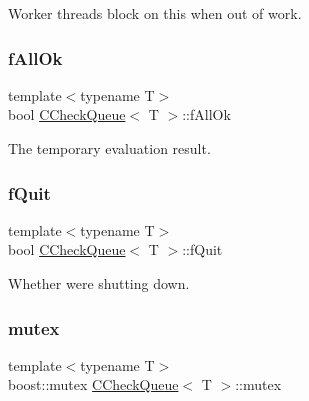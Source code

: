 Worker threads block on this when out of work. 

\mbox{\label{class_c_check_queue_a0f8ef0bce2f6c6ee71c85215a90ed41e}} 
\subsubsection{\texorpdfstring{f\+All\+Ok}{fAllOk}}
{\footnotesize\ttfamily template$<$typename T$>$ \\
bool \mbox{\hyperlink{class_c_check_queue}{C\+Check\+Queue}}$<$ T $>$\+::f\+All\+Ok\hspace{0.3cm}{\ttfamily [private]}}



The temporary evaluation result. 

\mbox{\label{class_c_check_queue_a46ea155382762d0f556cdfa3433f04c6}} 
\subsubsection{\texorpdfstring{f\+Quit}{fQuit}}
{\footnotesize\ttfamily template$<$typename T$>$ \\
bool \mbox{\hyperlink{class_c_check_queue}{C\+Check\+Queue}}$<$ T $>$\+::f\+Quit\hspace{0.3cm}{\ttfamily [private]}}



Whether we\textquotesingle{}re shutting down. 

\mbox{\label{class_c_check_queue_ae5f85fa9477f4b235186caed13fdb0bd}} 
\subsubsection{\texorpdfstring{mutex}{mutex}}
{\footnotesize\ttfamily template$<$typename T$>$ \\
boost\+::mutex \mbox{\hyperlink{class_c_check_queue}{C\+Check\+Queue}}$<$ T $>$\+::mutex\hspace{0.3cm}{\ttfamily [private]}}



